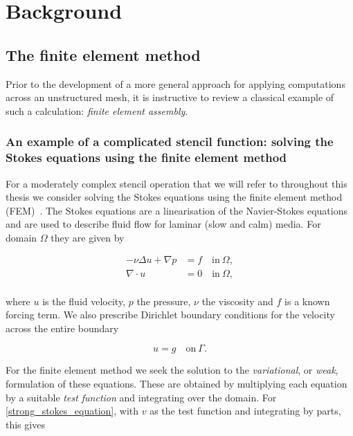 \documentclass[thesis]{subfiles}
\begin{document}
\chapter{Background}
\label{chapter:background}

\section{The finite element method}

Prior to the development of a more general approach for applying computations across an unstructured mesh, it is instructive to review a classical example of such a calculation: \textit{finite element assembly}.

\subsection{An example of a complicated stencil function: solving the Stokes equations using the finite element method}

For a moderately complex stencil operation that we will refer to throughout this thesis we consider solving the Stokes equations using the finite element method (FEM)~\parencite{larsonFiniteElementMethod2013}.
The Stokes equations are a linearisation of the Navier-Stokes equations and are used to describe fluid flow for laminar (slow and calm) media.
For domain $\Omega$ they are given by

\begin{align}
  \label{strong_stokes_equation}
  - \nu \Delta u + \nabla p &= f \quad \textrm{in} \ \Omega, \\
  \nabla \cdot u &= 0 \quad \textrm{in} \ \Omega, \\
\end{align}

where $u$ is the fluid velocity, $p$ the pressure, $\nu$ the viscosity and $f$ is a known forcing term.
We also prescribe Dirichlet boundary conditions for the velocity across the entire boundary

\begin{equation}
  \label{strong_stokes_equation_bc}
  u = g \quad \textrm{on} \ \Gamma. 
\end{equation}

For the finite element method we seek the solution to the \textit{variational}, or \textit{weak}, formulation of these equations.
These are obtained by multiplying each equation by a suitable \textit{test function} and integrating over the domain.
For \ref{strong_stokes_equation}, with $v$ as the test function and integrating by parts, this gives
\end{document}
